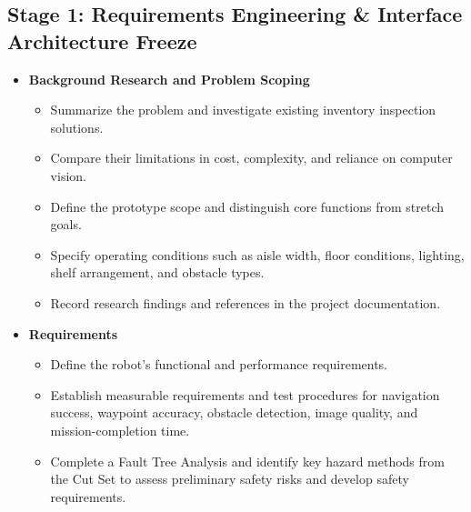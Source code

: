 \documentclass{article}
\begin{document}
\subsection{Stage 1: Requirements Engineering \& Interface Architecture Freeze}
\begin{itemize}
	\item \textbf{Background Research and Problem Scoping}
	\begin{itemize}
		\item Summarize the problem and investigate existing inventory inspection solutions.
		\item Compare their limitations in cost, complexity, and reliance on computer vision.
		\item Define the prototype scope and distinguish core functions from stretch goals.
		\item Specify operating conditions such as aisle width, floor conditions, lighting, shelf arrangement, and obstacle types.
		\item Record research findings and references in the project documentation.
	\end{itemize}
	
	\item \textbf{Requirements}
	\begin{itemize}
		\item Define the robot's functional and performance requirements.
		\item Establish measurable requirements and test procedures for navigation success, waypoint accuracy, obstacle detection, image quality, and mission-completion time.
		\item Complete a Fault Tree Analysis and identify key hazard methods from the Cut Set to assess preliminary safety risks and develop safety requirements.
	\end{itemize}
\end{itemize}
\end{document}
